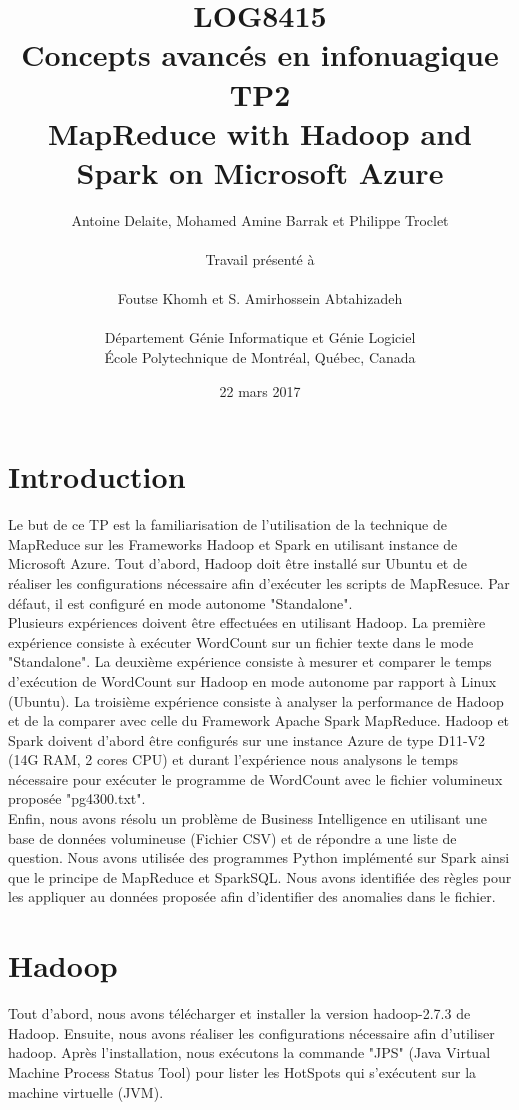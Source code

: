 \documentclass[11pt]{article}
\title{LOG8415 \\ Concepts avanc\'{e}s en infonuagique \\ TP2\\ MapReduce with Hadoop and Spark on Microsoft Azure}
\author{
	Antoine Delaite, Mohamed Amine Barrak et Philippe Troclet \\
		\\
	Travail pr\'{e}sent\'{e} \`a \\
		\\
	Foutse Khomh et S. Amirhossein Abtahizadeh \\
		\\
	D\'{e}partement G\'{e}nie Informatique et G\'{e}nie Logiciel \\
	\'{E}cole Polytechnique de Montr\'{e}al, Qu\'{e}bec, Canada
}
\date{22 mars 2017}
\begin{document}
\maketitle

\section{Introduction}

Le but de ce TP est la familiarisation de l'utilisation de la technique de MapReduce sur les Frameworks Hadoop et Spark en utilisant instance de Microsoft Azure. Tout d'abord, Hadoop doit être installé sur Ubuntu et de réaliser les configurations nécessaire afin d'exécuter les scripts de MapResuce. Par défaut, il est configuré en mode autonome "Standalone". 
\\

Plusieurs expériences doivent être effectuées en utilisant Hadoop. La première expérience consiste à exécuter WordCount sur un fichier texte dans le mode "Standalone". La deuxième expérience consiste à mesurer et comparer le temps d'exécution de WordCount sur Hadoop en mode autonome par rapport à Linux (Ubuntu). La troisième expérience consiste à analyser la performance de Hadoop et de la comparer avec celle du Framework Apache Spark MapReduce. Hadoop et Spark doivent d'abord être configurés sur une instance Azure de type D11-V2 (14G RAM, 2 cores CPU) et durant l'expérience nous analysons le temps nécessaire pour exécuter le programme de WordCount avec le fichier volumineux proposée "pg4300.txt". 
\\

Enfin, nous avons résolu un problème de Business Intelligence en utilisant une base de données volumineuse (Fichier CSV) et de répondre a une liste de question. Nous avons utilisée des programmes Python implémenté sur Spark ainsi que le principe de MapReduce et SparkSQL. Nous avons identifiée des règles pour les appliquer au données proposée afin d'identifier des anomalies dans le fichier.
\section{Hadoop}
Tout d'abord, nous avons télécharger et installer la version hadoop-2.7.3 de Hadoop. Ensuite, nous avons réaliser les configurations nécessaire afin d'utiliser hadoop.
Après l'installation, nous exécutons la commande "JPS" (Java Virtual Machine Process Status Tool) pour lister les HotSpots qui s'exécutent sur la machine virtuelle (JVM).
\end{document}
